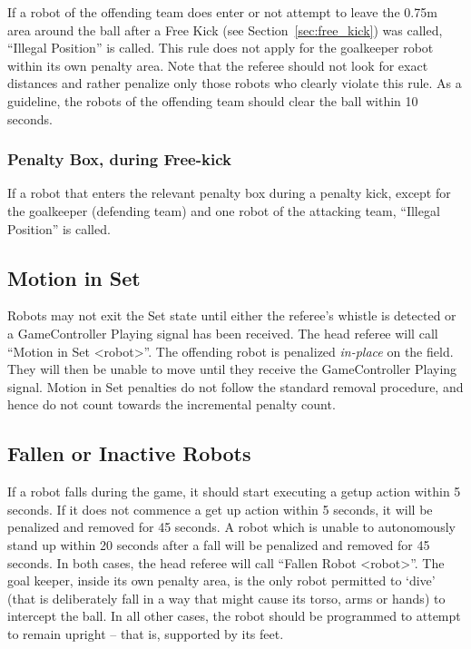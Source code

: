 \documentclass[12pt]{article}
\newcommand{\cf}{see\xspace}
\newcommand{\FreeKickRadius}{0.75m\xspace}
\begin{document}
If a robot of the offending team does enter or not attempt to leave the \FreeKickRadius area around the ball after a Free Kick (\cf Section~\ref{sec:free_kick}) was called, ``Illegal Position'' is called. This rule does not apply for the goalkeeper robot within its own penalty area. Note that the referee should not look for exact distances and rather penalize only those robots who clearly violate this rule. As a guideline, the robots of the offending team should clear the ball within 10 seconds.

\subsubsection{Penalty Box, during Free-kick}

If a robot that enters the relevant penalty box during a penalty kick, except for the goalkeeper (defending team) and one robot of the attacking team, ``Illegal Position'' is called.

\subsection{Motion in Set}
\label{sec:motion_in_set}

Robots may not exit the Set state until either the referee's whistle is detected or a GameController Playing signal has been received.
The head referee will call ``Motion in Set \textless robot\textgreater''.
The offending robot is penalized \textit{in-place} on the field.  They will then be unable to move until they receive the GameController Playing signal.  Motion in Set penalties do not follow the standard removal procedure, and hence do not count towards the incremental penalty count.

\subsection{Fallen or Inactive Robots}
\label{sec:fallenrobots}

If a robot falls during the game, it should start executing a getup action within 5 seconds. If it does not commence a get up action within 5 seconds, it will be penalized and removed for 45 seconds.
A robot which is unable to autonomously stand up within 20 seconds after a fall will be penalized and removed for 45 seconds.
In both cases, the head referee will call ``Fallen Robot  \textless robot\textgreater''.
The goal keeper, inside its own penalty area, is the only robot permitted to `dive' (that is deliberately fall in a way that might cause its torso, arms or hands) to intercept the ball. In all other cases, the robot should be programmed to attempt to remain upright -- that is, supported by its feet.
\end{document}
